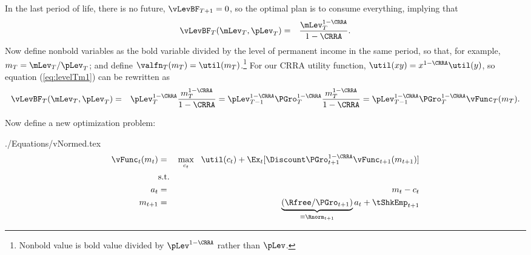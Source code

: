\documentclass[titlepage]{\econtex}
\begin{document}
In the last period of life, there is no
future, $\vLevBF_{T+1} = 0$, so
the optimal plan is to consume everything, implying that
\begin{eqnarray}
  \vLevBF_{T}(\mLev_{T},\pLev_{T}) & = & \frac{\mLev_{T}^{1-\CRRA}}{1-\CRRA}. \label{eq:levelTm1}
\end{eqnarray}
Now define nonbold variables as the bold variable divided by
the level of permanent income in the same period, so that, for
example, ${m}_{T}=\mLev_{T}/\pLev_{T}$; and define
$\valfn_{T}({m}_{T}) = \util({m}_{T})$.\footnote{Nonbold value is bold value divided by $\pLev^{1-\CRRA}$ rather than $\pLev$.}  For our CRRA utility function, $\util(xy)=x^{1-\CRRA}\util(y)$, so equation (\ref{eq:levelTm1}) can be
rewritten as
\begin{eqnarray*}
  \vLevBF_{T}(\mLev_{T},\pLev_{T}) & = & \pLev_{T}^{1-\CRRA}\frac{{m}_{T}^{1-\CRRA}}{1-\CRRA} = \pLev_{T-1}^{1-\CRRA}\PGro_{T}^{1-\CRRA}\frac{{m}_{T}^{1-\CRRA}}{1-\CRRA}  = \pLev_{T-1}^{1-\CRRA}\PGro_{T}^{1-\CRRA}\vFunc_{T}({m}_{T}).
\end{eqnarray*}


Now define a new optimization problem:
\begin{verbatimwrite}{./Equations/vNormed.tex}
  \begin{eqnarray}
    \null{\vFunc}_{t}({m}_{t}) & = & \max_{{c}_{t}} ~~ \util({c}_{t})+
                                     \Ex_{t}[{\Discount} \PGro_{t+1}^{1-\CRRA}\null{\vFunc}_{t+1}({m}_{t+1})] \label{vtNorm}
    \\         & \text{s.t.} &   \nonumber \\
    {a}_{t}   & = & {m}_{t}-{c}_{t} \nonumber
    \\      {m}_{t+1} & = & \underbrace{\left(\Rfree/\PGro_{t+1}\right)}_{\equiv \Rnorm_{t+1}}{a}_{t}+\tShkEmp_{t+1} \nonumber
  \end{eqnarray}
\end{verbatimwrite}

\end{document}
